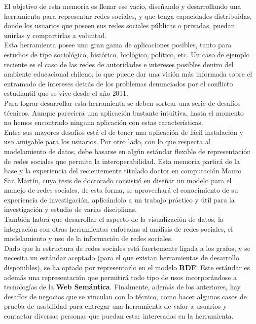 \begin{intro}
  El objetivo de esta memoria es llenar ese vacío, diseñando y desarrollando una herramienta para representar redes sociales, y que tenga capacidades distribuidas, donde los usuarios que poseen sus redes sociales públicas o privadas, puedan unirlas y compartirlas a voluntad.\\

  Esta herramienta posee una gran gama de aplicaciones posibles, tanto para estudios de tipo sociológico, histórico, biológico, político, etc. Un caso de ejemplo reciente es el caso de las redes de autoridades e intereses posibles dentro del ambiente educacional chileno, lo que puede dar una visión más informada sobre el entramado de intereses detrás de los problemas denunciados por el conflicto estudiantil que se vive desde el año 2011.\\

  Para lograr desarrollar esta herramienta se deben sortear una serie de desafíos técnicos. Aunque pareciera una aplicación bastante intuitiva, hasta el momento no hemos encontrado ninguna aplicación con estas características.\\

  Entre sus mayores desafíos está el de tener una aplicación de fácil instalación y uso amigable para los usuarios. Por otro lado, con lo que respecta al modelamiento de datos, debe basarse en algún estándar flexible de representación de redes sociales que permita la interoperabilidad. Esta memoria partirá de la base y la experiencia del recientemente titulado doctor en computación Mauro San Martín, cuya tesis de doctorado consistió en diseñar un modelo para el manejo de redes sociales, de esta forma, se aprovechará el conocimiento de su experiencia de investigación, aplicándolo a un trabajo práctico y útil para la investigación y estudio de varias disciplinas.\\

  También habrá que desarrollar el aspecto de la visualización de datos, la integración con otras herramientas enfocadas al análisis de redes sociales, el modelamiento y uso de la información de redes sociales.\\

  Dado que la estructura de redes sociales está fuertemente ligada a los grafos, y se necesita un estándar aceptado (para el que existan herramientas de desarrollo disponibles), se ha optado por representarlo en el modelo \textbf{RDF}. Este estándar es además una representación que permitirá todo tipo de usos incorporándose a tecnologías de la \textbf{Web Semántica}. Finalmente, además de los anteriores, hay desafíos de negocios que se vinculan con lo técnico, como hacer algunos casos de prueba de usabilidad para entregar una herramienta de valor a usuarios y contactar diversas personas que puedan estar interesadas en la herramienta.\\


\end{intro}
